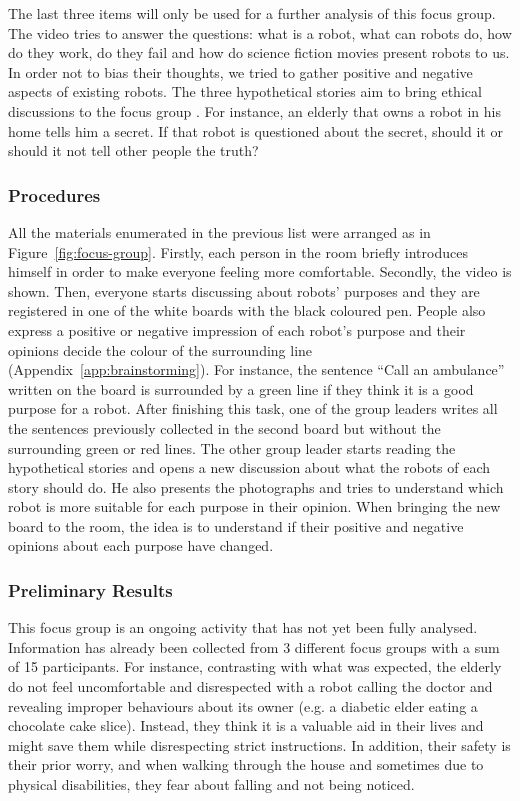 The last three items will only be used for a further analysis of this focus group.
The video tries to answer the questions: what is a robot, what can robots do, how do they work, do they fail and how do science fiction movies present robots to us.
In order not to bias their thoughts, we tried to gather positive and negative aspects of existing robots.
The three hypothetical stories aim to bring ethical discussions to the focus group \cite{Kahn2006,Should2010}.
For instance, an elderly that owns a robot in his home tells him a secret.
If that robot is questioned about the secret, should it or should it not tell other people the truth?

\subsubsection{Procedures}
All the materials enumerated in the previous list were arranged as in Figure~\ref{fig:focus-group}.
Firstly, each person in the room briefly introduces himself in order to make everyone feeling more comfortable.
Secondly, the video is shown.
Then, everyone starts discussing about robots' purposes and they are registered in one of the white boards with the black coloured pen.
People also express a positive or negative impression of each robot's purpose and their opinions decide the colour of the surrounding line (Appendix~\ref{app:brainstorming}).
For instance, the sentence ``Call an ambulance'' written on the board is surrounded by a green line if they think it is a good purpose for a robot.
After finishing this task, one of the group leaders writes all the sentences previously collected in the second board but without the surrounding green or red lines.
The other group leader starts reading the hypothetical stories and opens a new discussion about what the robots of each story should do.
He also presents the photographs and tries to understand which robot is more suitable for each purpose in their opinion.
When bringing the new board to the room, the idea is to understand if their positive and negative opinions about each purpose have changed.


\subsubsection{Preliminary Results}

This focus group is an ongoing activity that has not yet been fully analysed.
Information has already been collected from 3 different focus groups with a sum of 15 participants.
For instance, contrasting with what was expected, the elderly do not feel uncomfortable and disrespected with a robot calling the doctor and revealing improper behaviours about its owner (e.g. a diabetic elder eating a chocolate cake slice).
Instead, they think it is a valuable aid in their lives and might save them while disrespecting strict instructions.
In addition, their safety is their prior worry, and when walking through the house and sometimes due to physical disabilities, they fear about falling and not being noticed.




